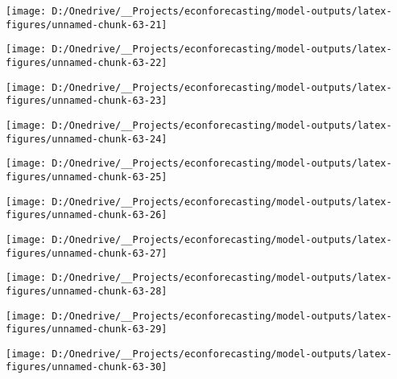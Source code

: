 \documentclass[11pt, letterpaper]{article}\usepackage[]{graphicx}\usepackage[]{color}
\begin{document}
{\centering \texttt{[image: D:/Onedrive/\_\_Projects/econforecasting/model-outputs/latex-figures/unnamed-chunk-63-21]} 

}




{\centering \texttt{[image: D:/Onedrive/\_\_Projects/econforecasting/model-outputs/latex-figures/unnamed-chunk-63-22]} 

}




{\centering \texttt{[image: D:/Onedrive/\_\_Projects/econforecasting/model-outputs/latex-figures/unnamed-chunk-63-23]} 

}




{\centering \texttt{[image: D:/Onedrive/\_\_Projects/econforecasting/model-outputs/latex-figures/unnamed-chunk-63-24]} 

}




{\centering \texttt{[image: D:/Onedrive/\_\_Projects/econforecasting/model-outputs/latex-figures/unnamed-chunk-63-25]} 

}




{\centering \texttt{[image: D:/Onedrive/\_\_Projects/econforecasting/model-outputs/latex-figures/unnamed-chunk-63-26]} 

}




{\centering \texttt{[image: D:/Onedrive/\_\_Projects/econforecasting/model-outputs/latex-figures/unnamed-chunk-63-27]} 

}




{\centering \texttt{[image: D:/Onedrive/\_\_Projects/econforecasting/model-outputs/latex-figures/unnamed-chunk-63-28]} 

}




{\centering \texttt{[image: D:/Onedrive/\_\_Projects/econforecasting/model-outputs/latex-figures/unnamed-chunk-63-29]} 

}




{\centering \texttt{[image: D:/Onedrive/\_\_Projects/econforecasting/model-outputs/latex-figures/unnamed-chunk-63-30]} 

}
\end{document}
